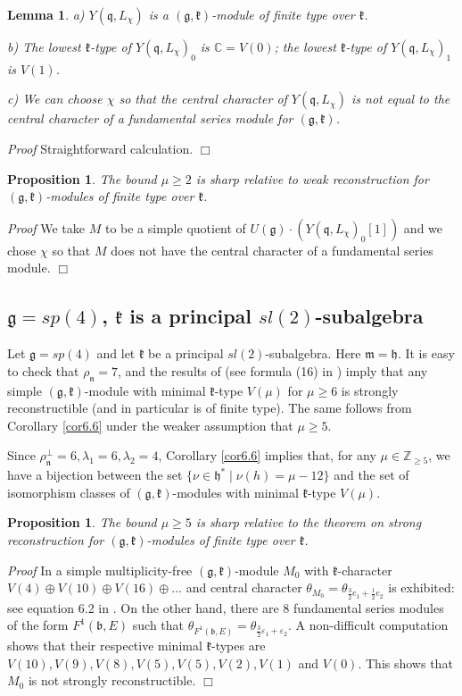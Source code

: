 \documentclass[11pt]{amsart}
\newcounter{theorem}
\newtheorem{lemma}[theo]{Lemma}
\newtheorem{prop}[theo]{Proposition}
\renewenvironment{proof}{ \emph{Proof}}{$\Box$}
\newcommand{\kk}{\mathfrak{k}}
\newcommand{\nn}{\mathfrak{n}}
\newcommand{\mm}{\mathfrak{m}}
\newcommand{\hh}{\mathfrak{h}}
\newcommand{\qq}{\mathfrak{q}}
\renewcommand{\gg}{\mathfrak{g}}
\newcommand{\bb}{\mathfrak{b}}
\newcommand{\refcor}[1]{Corollary \ref{#1}}
\newcommand{\field}[1]{\mathbb{#1}}
\begin{document}
\begin{lemma}
a) $Y(\qq,L_\chi)$ is a $(\gg,\kk)$-module of finite type over $\kk$.

b) The lowest $\kk$-type of $Y(\qq,L_\chi)_0$ is $\field{C}=V(0)$; the lowest $\kk$-type of $Y(\qq,L_\chi)_1$ is $V(1)$.

c) We can choose $\chi$ so that the central character of $Y(\qq,L_\chi)$ is not equal to the central character of a fundamental series module for $(\gg,\kk)$.
\end{lemma}
\begin{proof}
Straightforward calculation.
\end{proof}
\begin{prop}\label{pr8.14}
The bound $\mu\geq 2$ is sharp relative to weak reconstruction for $(\gg,\kk)$-modules of finite type over $\kk$.
\end{prop}
\begin{proof}
We take $M$ to be a simple quotient of $U(\gg)\cdot(Y(\qq,L_\chi)_0[1])$ and we chose $\chi$ so that $M$ does not have the central character of a fundamental series module.
\end{proof}

\subsection{$\gg=sp(4)$, $\kk$ is a principal $sl(2)$-subalgebra} %

Let $\gg=sp(4)$ and let $\kk$ be a principal $sl(2)$-subalgebra. Here $\mm=\hh$. It is easy to check that $\rho_\nn=7$, and the results of \cite{PZ2} (see formula (16) in \cite{PZ2}) imply that any simple $(\gg,\kk)$-module with minimal $\kk$-type $V(\mu)$ for $\mu\geq 6$ is strongly reconstructible (and in particular is of finite type). The same follows from \refcor{cor6.6} under the weaker assumption that $\mu\geq 5$.

Since $\rho_\nn^\perp=6,\lambda_1=6,\lambda_2=4$, \refcor{cor6.6} implies that, for any $\mu\in\field{Z}_{\geq 5}$, we have a bijection between the set $\{\nu\in\hh^*\; |\; \nu(h)=\mu-12\}$ and the set of isomorphism classes of $(\gg,\kk)$-modules with minimal $\kk$-type $V(\mu)$.

\begin{prop}
The bound $\mu\geq 5$ is sharp relative to the theorem on strong reconstruction for $(\gg,\kk)$-modules of finite type over $\kk$.
\end{prop}
\begin{proof}
In \cite{PS2} a simple multiplicity-free $(\gg,\kk)$-module $M_0$ with $\kk$-character $V(4)\oplus V(10)\oplus V(16)\oplus...$ and central character $\theta_{M_0}=\theta_{\frac{3}{2}e_1+\frac{1}{2}e_2}$ is exhibited: see equation 6.2 in \cite{PS2}. On the other hand, there are 8 fundamental series modules of the form $F^1(\bb,E)$ such that $\theta_{F^1(\bb,E)}=\theta_{\frac{3}{2}\varepsilon_1+\varepsilon_2}$. A non-difficult computation shows that their respective minimal $\kk$-types are $V(10),V(9),V(8),V(5),V(5),V(2),V(1)$ and $V(0)$. This shows that $M_0$ is not strongly reconstructible.
\end{proof}
\end{document}
